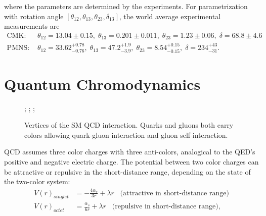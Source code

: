 \noindent where the parameters are determined by the experiments. For parametrization with rotation angle $[ \theta_{12},\theta_{13},\theta_{23},\delta_{13}] $, the world average experimental measurements are
\begin{align}
    \text{CMK: } & \theta_{12}=13.04\pm0.15, \; \theta_{13}=0.201\pm0.011, \; \theta_{23}=1.23\pm0.06, \; \delta = 68.8\pm 4.6  \\
    \text{PMNS: } &\theta_{12}=33.62 ^{+0.78}_{-0.76}, \;  \theta_{13}=47.2  ^{+1.9}_{-3.9}, \; \theta_{23}= 8.54 ^{+0.15}_{-0.15}, \;  \delta = 234 ^{+43}_{-31}.
\end{align}


\section{Quantum Chromodynamics}
\label{sec:physics:qft:qcd}



\begin{figure}[ht]
    \centering
    ; \qquad
    ; \qquad
    ;    
    \caption{Vertices of the SM QCD interaction. Quarks and gluons both carry colors allowing quark-gluon interaction and gluon self-interaction. }
    \label{fig:my_label}
\end{figure}

QCD assumes three color charges with three anti-colors, analogical to the QED's positive and negative electric charge. The potential between two color charges can be attractive or repulsive in the short-distance range, depending on the state of the two-color system:
\begin{align}
	 V(r)_{singlet} &= -\frac{4\alpha_s}{3r} + \lambda r \;\;\; \text{(attractive in short-distance range)}\\
    V(r)_{octet} &= \frac{\alpha_s}{6r} + \lambda r \;\;\; \text{(repulsive in short-distance range)}, 
\end{align}


